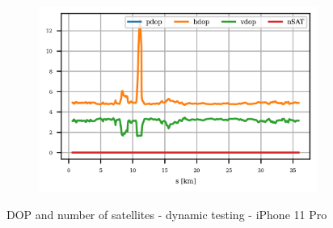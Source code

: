 \documentclass{article}
\begin{document}
			\begin{figure}[h]
		   		\centering
		     	\begin{subfigure}[b]{0.45\textwidth}
		      		\centering
		      	   \includegraphics[width=\textwidth]{Dynamic/cond_dop_IPhone 11 Pro.png}
		     	\end{subfigure}
				\caption{DOP and number of satellites - dynamic testing - iPhone 11 Pro}		     	
		      \label{fig:dyn_dop_iphone}
			\end{figure}
			
\end{document}
